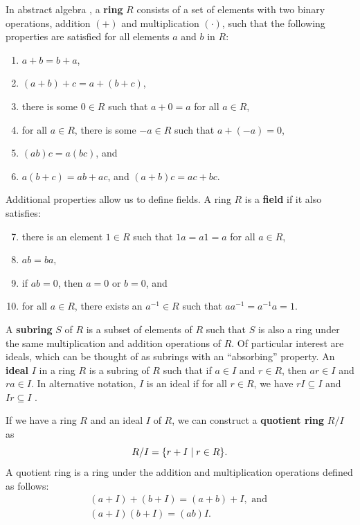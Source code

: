 In abstract algebra \cite{Judson2016}, a \textbf{ring} $R$ consists of a set of elements with two binary operations, addition $(+)$ and multiplication $(\cdot)$, such that the following properties are satisfied for all elements $a$ and $b$ in $R$:
\begin{enumerate}
	\item $a + b = b + a$,
    \item $(a + b) + c = a + (b + c)$,
    \item there is some $0 \in R$ such that $a + 0 = a$ for all $a \in R$,
    \item for all $a \in R$, there is some $-a \in R$ such that $a + (-a) = 0$,
    \item $(ab)c = a(bc)$, and 
    \item $a(b+c) = ab + ac$, and $(a+b)c = ac + bc$.
\end{enumerate}
Additional properties allow us to define fields. A ring $R$ is a \textbf{field} if it also satisfies:
\begin{enumerate}
  \setcounter{enumi}{6}
  \item there is an element $1 \in R$ such that $1a = a1 = a$ for all $a \in R$, 
  \item $ab = ba$,
  \item if $ab = 0$, then $a = 0$ or $b = 0$, and
  \item for all $a \in R$, there exists an $a^{-1} \in R$ such that $aa^{-1} = a^{-1}a  = 1$.
\end{enumerate}
A \textbf{subring} $S$ of $R$ is a subset of elements of $R$ such that $S$ is also a ring under the same multiplication and addition operations of $R$. Of particular interest are ideals, which can be thought of as subrings with an ``absorbing'' property. An \textbf{ideal} $I$ in a ring $R$ is a subring of $R$ such that if $a \in I$ and $r \in R$, then $ar \in I$ and $ra \in I$. In alternative notation, $I$ is an ideal if for all $r \in R$, we have $rI \subseteq I$ and $Ir \subseteq I$ \cite{Judson2016}. 

If we have a ring $R$ and an ideal $I$ of $R$, we can construct a \textbf{quotient ring} $R/I$ as
$$
R/I= \{ r + I \; | \; r \in R \}.
$$
A quotient ring is a ring under the addition and multiplication operations defined as follows:
\begin{gather*}
(a + I) + (b + I) =  (a + b) + I, \textrm{ and } \\
(a + I) (b + I) = (ab) I \textrm{.}
\end{gather*}


